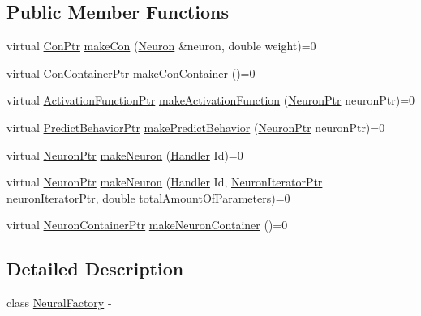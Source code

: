 \subsection*{Public Member Functions}
\begin{DoxyCompactItemize}
\item 
virtual \hyperlink{_a_m_o_r_e_8h_a169bb8e5f26ce70bf2b10dec2fb5ee50}{ConPtr} \hyperlink{class_neural_factory_a0d11171bb9e5d09544e8d58a9324b923}{makeCon} (\hyperlink{class_neuron}{Neuron} \&neuron, double weight)=0
\item 
virtual \hyperlink{_a_m_o_r_e_8h_a1021dbaf961d1c8da6d58a8566e5778b}{ConContainerPtr} \hyperlink{class_neural_factory_a4fa5f4f57a2551c95481146b1a0c83d7}{makeConContainer} ()=0
\item 
virtual \hyperlink{_a_m_o_r_e_8h_a77602a0277a02e5769c3df0adc669b17}{ActivationFunctionPtr} \hyperlink{class_neural_factory_a678ec16456e5772a2c188c475a78c588}{makeActivationFunction} (\hyperlink{_a_m_o_r_e_8h_ac1ea936c2c7728eb382278131652fef4}{NeuronPtr} neuronPtr)=0
\item 
virtual \hyperlink{_a_m_o_r_e_8h_a1fb2f1f8fdf1e08c42ef4bdce436af93}{PredictBehaviorPtr} \hyperlink{class_neural_factory_a3d49ef5f05c82cc2c614e884ed3a27d5}{makePredictBehavior} (\hyperlink{_a_m_o_r_e_8h_ac1ea936c2c7728eb382278131652fef4}{NeuronPtr} neuronPtr)=0
\item 
virtual \hyperlink{_a_m_o_r_e_8h_ac1ea936c2c7728eb382278131652fef4}{NeuronPtr} \hyperlink{class_neural_factory_a12abbf93f829aab585975f157c8c98f7}{makeNeuron} (\hyperlink{_a_m_o_r_e_8h_abc871abb71cff6655b8172ee7240b8ef}{Handler} Id)=0
\item 
virtual \hyperlink{_a_m_o_r_e_8h_ac1ea936c2c7728eb382278131652fef4}{NeuronPtr} \hyperlink{class_neural_factory_a19c08ba7ad05ef7af05f7595dda2100b}{makeNeuron} (\hyperlink{_a_m_o_r_e_8h_abc871abb71cff6655b8172ee7240b8ef}{Handler} Id, \hyperlink{_a_m_o_r_e_8h_aa794539c0a68e4eb451e7a2cc6294acc}{NeuronIteratorPtr} neuronIteratorPtr, double totalAmountOfParameters)=0
\item 
virtual \hyperlink{_a_m_o_r_e_8h_a6157c259718f98f808c85d7f77048970}{NeuronContainerPtr} \hyperlink{class_neural_factory_ab8fe3634f3715f99616fe9498a29badb}{makeNeuronContainer} ()=0
\end{DoxyCompactItemize}


\subsection{Detailed Description}
class \hyperlink{class_neural_factory}{NeuralFactory} -\/ 

